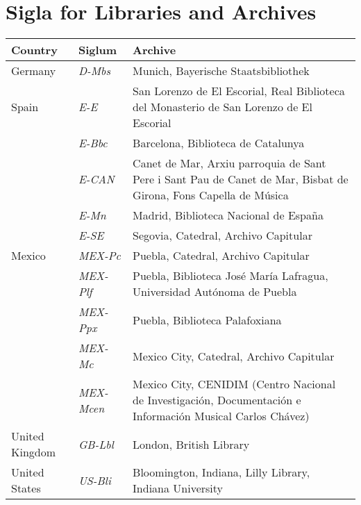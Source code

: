 \section*{Sigla for Libraries and Archives}

\begin{tabulary}{\linewidth}{llL}
    \toprule
    Country
    & Siglum
    & Archive\\
    \midrule

    Germany 
    & \emph{D-Mbs}
    & Munich, Bayerische Staatsbibliothek\\
    \addlinespace

    Spain 
    & \emph{E-E}
    & San Lorenzo de El Escorial, 
    Real Biblioteca del Monasterio de San Lorenzo de El Escorial\\ 

    & \emph{E-Bbc}
    & Barcelona, Biblioteca de Catalunya\\

    & \emph{E-CAN}
    & Canet de Mar, Arxiu parroquia de Sant Pere i Sant Pau 
    de Canet de Mar, Bisbat de Girona, Fons Capella de Música\\

    & \emph{E-Mn}
    & Madrid, Biblioteca Nacional de España\\

    & \emph{E-SE}
    & Segovia, Catedral, Archivo Capitular\\
    \addlinespace

    Mexico
    & \emph{MEX-Pc}
    & Puebla, Catedral, Archivo Capitular\\

    & \emph{MEX-Plf}
    & Puebla, Biblioteca José María Lafragua, Universidad Autónoma de Puebla\\

    & \emph{MEX-Ppx}
    & Puebla, Biblioteca Palafoxiana\\

    & \emph{MEX-Mc}
    & Mexico City, Catedral, Archivo Capitular\\

    & \emph{MEX-Mcen}
    & Mexico City, CENIDIM (Centro Nacional de Investigación, 
    Documentación e Información Musical Carlos Chávez)\\
    \addlinespace

    United Kingdom 
    & \emph{GB-Lbl}
    & London, British Library\\
    \addlinespace

    United States
    & \emph{US-Bli}
    & Bloomington, Indiana, Lilly Library, Indiana University\\
    \bottomrule
\end{tabulary}

